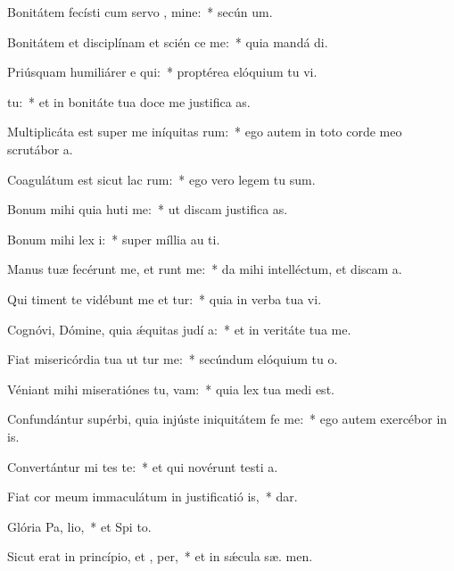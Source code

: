 \item Bonitátem fecísti cum servo , mine:~* secún  um.
\item Bonitátem et disciplínam et scién ce me:~* quia mandá  di.
\item Priúsquam humiliárer e qui:~* proptérea elóquium tu vi.
\item {}  tu:~* et in bonitáte tua doce me justifica as.
\item Multiplicáta est super me iníquitas rum:~* ego autem in toto corde meo scrutábor  a.
\item Coagulátum est sicut lac  rum:~* ego vero legem tu  sum.
\item Bonum mihi quia huti me:~* ut discam justifica as.
\item Bonum mihi lex  i:~* super míllia au  ti.
\item Manus tuæ fecérunt me, et runt me:~* da mihi intelléctum, et discam  a.
\item Qui timent te vidébunt me et tur:~* quia in verba tua vi.
\item Cognóvi, Dómine, quia ǽquitas judí a:~* et in veritáte tua  me.
\item Fiat misericórdia tua ut tur me:~* secúndum elóquium tu  o.
\item Véniant mihi miseratiónes tu,  vam:~* quia lex tua medi  est.
\item Confundántur supérbi, quia injúste iniquitátem fe  me:~* ego autem exercébor in  is.
\item Convertántur mi tes te:~* et qui novérunt testi a.
\item Fiat cor meum immaculátum in justificatió is,~*   dar.
\item Glória Pa,  lio,~* et Spi to.
\item Sicut erat in princípio, et ,  per,~* et in sǽcula sæ. men.
